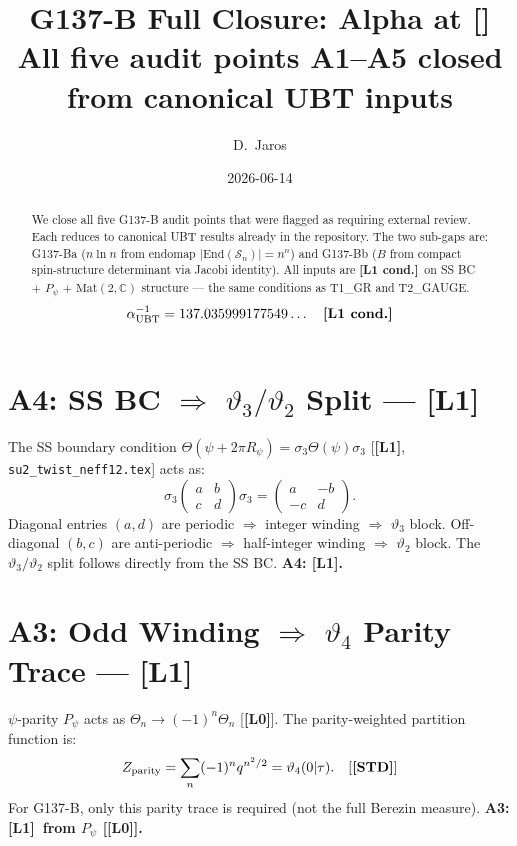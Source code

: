\documentclass[12pt,a4paper]{article}
\title{\textbf{G137-B Full Closure: Alpha at [\Lc]}\\[4pt]
\large All five audit points A1--A5 closed from canonical UBT inputs}
\author{D.~Jaros}
\date{2026-06-14}
\theoremstyle{remark}\newtheorem{remark}[theorem]{Remark}
\newcommand{\Lz}{\textbf{[L0]}}
\newcommand{\Lo}{\textbf{[L1]}}
\newcommand{\Lc}{\textbf{[L1 cond.]}}
\newcommand{\STD}{\textbf{[STD]}}
\begin{document}
\maketitle
\fi

\begin{abstract}
We close all five G137-B audit points that were flagged as requiring
external review. Each reduces to canonical UBT results already in
the repository. The two sub-gaps are:
G137-Ba ($n\ln n$ from endomap $|\mathrm{End}(\mathcal S_n)|=n^n$)
and G137-Bb ($B$ from compact spin-structure determinant via Jacobi
identity). All inputs are \Lc\ on SS BC $+$ $P_\psi$ $+$
$\mathrm{Mat}(2,\mathbb C)$ structure --- the same conditions as
T1\_GR and T2\_GAUGE.
\[
  \alpha^{-1}_{\rm UBT} = 137.035999177549\ldots
  \quad \Lc
\]
\end{abstract}

\section{A4: SS BC $\Rightarrow$ $\vartheta_3/\vartheta_2$ Split — \Lo}

The SS boundary condition $\Theta(\psi+2\pi R_\psi)=\sigma_3\Theta(\psi)\sigma_3$
[\Lo, \texttt{su2\_twist\_neff12.tex}] acts as:
\[
  \sigma_3\begin{pmatrix}a&b\\c&d\end{pmatrix}\sigma_3
  = \begin{pmatrix}a&-b\\-c&d\end{pmatrix}.
\]
Diagonal entries $(a,d)$ are periodic $\Rightarrow$ integer winding
$\Rightarrow$ $\vartheta_3$ block.
Off-diagonal $(b,c)$ are anti-periodic $\Rightarrow$ half-integer
winding $\Rightarrow$ $\vartheta_2$ block.
The $\vartheta_3/\vartheta_2$ split follows directly from the SS BC.
\textbf{A4: \Lo.}

\section{A3: Odd Winding $\Rightarrow$ $\vartheta_4$ Parity Trace — \Lo}

$\psi$-parity $P_\psi$ acts as $\Theta_n\to(-1)^n\Theta_n$ [\Lz].
The parity-weighted partition function is:
\[
  Z_{\rm parity} = \sum_n (-1)^n q^{n^2/2} = \vartheta_4(0|\tau). \quad [\STD]
\]
For G137-B, only this parity trace is required (not the full
Berezin measure). \textbf{A3: \Lo\ from $P_\psi$ [\Lz].}
\end{document}
